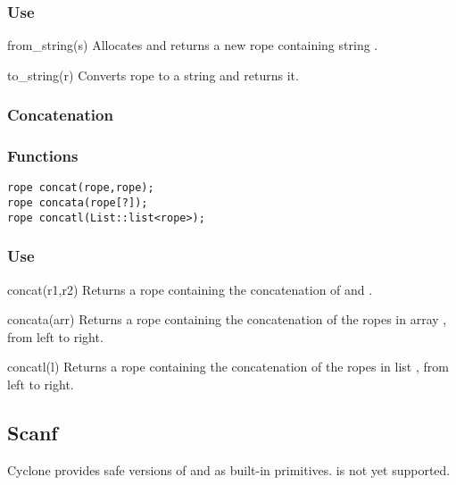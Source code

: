 \subsubsection*{Use}

\begin{defun}{from_string}{(s)}
Allocates and returns a new rope containing string .
\end{defun}

\begin{defun}{to_string}{(r)}
Converts rope  to a string and returns it.
\end{defun}

\subsubsection*{Concatenation}
\subsubsection*{Functions}
\begin{verbatim}
rope concat(rope,rope);
rope concata(rope[?]);
rope concatl(List::list<rope>);
\end{verbatim}

\subsubsection*{Use}

\begin{defun}{concat}{(r1,r2)}
Returns a rope containing the concatenation of  and .
\end{defun}

\begin{defun}{concata}{(arr)}
Returns a rope containing the concatenation of the ropes in array
, from left to right.
\end{defun}

\begin{defun}{concatl}{(l)}
Returns a rope containing the concatenation of the ropes in list
, from left to right.
\end{defun}

\subsection{Scanf}

Cyclone provides safe versions of  and  as
built-in primitives.   is not yet supported.

